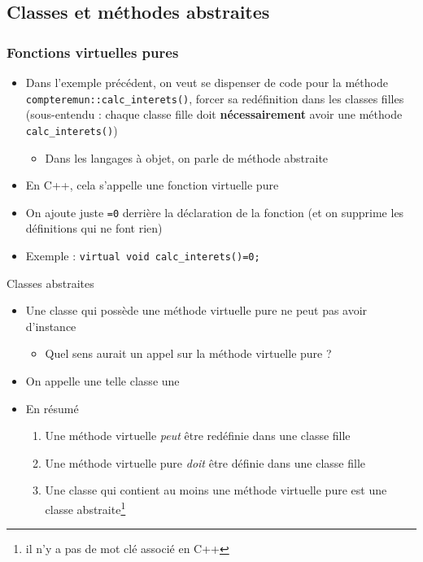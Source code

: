 


\subsection{Classes et méthodes abstraites}

\begin{frame}[fragile]\frametitle{Fonctions virtuelles pures}
\label{secabstract}
\begin{itemize}
\item Dans l'exemple précédent, on veut se dispenser de code pour la méthode \verb!compteremun::calc_interets()!, forcer sa redéfinition dans les classes filles (sous-entendu : chaque classe fille doit \textbf{nécessairement} avoir une méthode \verb|calc_interets()|)
\begin{itemize}
\item Dans les langages à objet, on parle de méthode abstraite
\end{itemize}
\item En C++, cela s'appelle une fonction virtuelle pure
\item On ajoute juste \verb|=0| derrière la déclaration de la fonction (et on supprime les définitions qui ne font rien)
\item Exemple : \verb|virtual void calc_interets()=0;|
\end{itemize}
\end{frame}

\begin{frame}{Classes abstraites}
\begin{itemize}
\item Une classe qui possède une méthode virtuelle pure ne peut pas avoir d'instance
\begin{itemize}
\item Quel sens aurait un appel sur la méthode virtuelle pure ?
\end{itemize}
\item On appelle une telle classe une 
\item En résumé
\begin{enumerate}
\item Une méthode virtuelle \textit{peut} être redéfinie dans une classe fille
\item Une méthode virtuelle pure \textit{doit} être définie dans une classe fille
\item Une classe qui contient au moins une méthode virtuelle pure est une classe abstraite\footnote{il n'y a pas de mot clé associé en C++}
\end{enumerate}
\end{itemize}
\end{frame}

